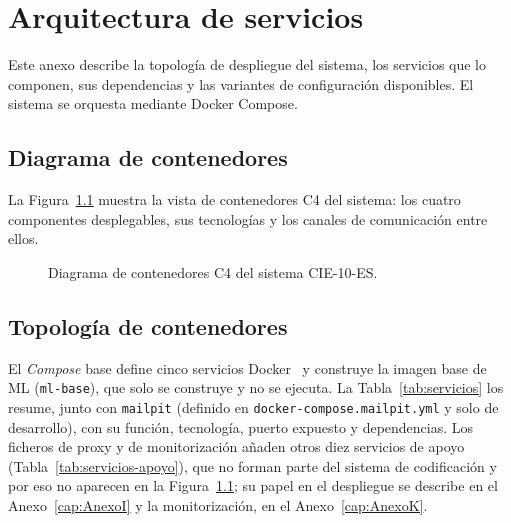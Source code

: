 \chapter{Arquitectura de servicios}
\label{cap:AnexoB}

Este anexo describe la topología de despliegue del sistema, los servicios que lo componen, sus dependencias y las variantes de configuración disponibles. El sistema se orquesta mediante Docker Compose.

\section{Diagrama de contenedores}

La Figura~\ref{fig:c4-contenedores} muestra la vista de contenedores C4 del sistema: los cuatro componentes desplegables, sus tecnologías y los canales de comunicación entre ellos.

\begin{figure}[ht]
\centering
\resizebox{\textwidth}{!}{}
\caption{Diagrama de contenedores C4 del sistema CIE-10-ES.}
\label{fig:c4-contenedores}
\end{figure}

\section{Topología de contenedores}

El \emph{Compose} base define cinco servicios Docker~\cite{merkel2014docker} y construye la imagen base de ML (\texttt{ml-base}), que solo se construye y no se ejecuta. La Tabla~\ref{tab:servicios} los resume, junto con \texttt{mailpit} (definido en \texttt{docker-compose.mailpit.yml} y solo de desarrollo), con su función, tecnología, puerto expuesto y dependencias. Los ficheros de proxy y de monitorización añaden otros diez servicios de apoyo (Tabla~\ref{tab:servicios-apoyo}), que no forman parte del sistema de codificación y por eso no aparecen en la Figura~\ref{fig:c4-contenedores}; su papel en el despliegue se describe en el Anexo~\ref{cap:AnexoI} y la monitorización, en el Anexo~\ref{cap:AnexoK}.

